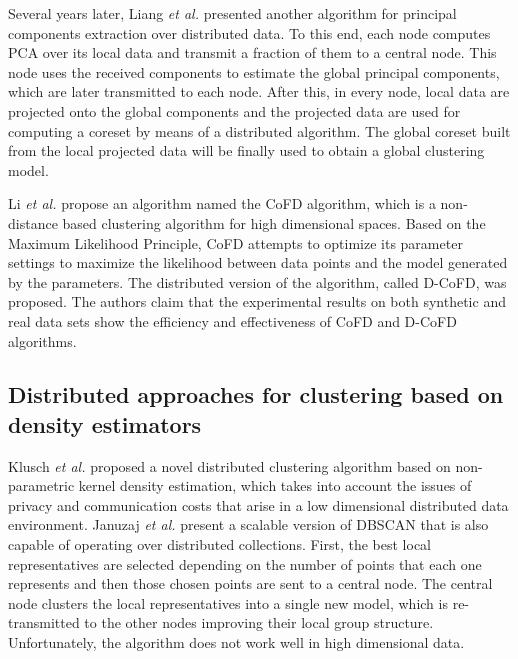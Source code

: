 \documentclass[preprint,12pt,authoryear,review]{elsarticle}
\begin{document}
Several years later, Liang \textit{et al.} \cite{LBK13} presented another algorithm for principal components extraction over distributed data. To this end, each node computes PCA over its local data and transmit a fraction of them to a central node. This node uses the received components to estimate the global principal components, which are later transmitted to each node. After this, in every node, local data are projected onto the global components and the projected data are used for computing a coreset by means of a distributed algorithm. The global coreset built from the local projected data will be finally used to obtain a global clustering model.  

Li \textit{et al.} \cite{LZO03} propose an algorithm named the CoFD algorithm, which is a non-distance based clustering algorithm for high dimensional spaces. Based on the Maximum Likelihood Principle, CoFD attempts to optimize its parameter settings to maximize the likelihood between data points and the model generated by the parameters. The distributed version of the algorithm, called D-CoFD, was proposed. The authors claim that the experimental results on both synthetic and real data sets show the efficiency and effectiveness of CoFD and D-CoFD algorithms.

\subsection{Distributed approaches for clustering based on density estimators}

Klusch \textit{et al.} \cite{KLM03} proposed a novel distributed clustering algorithm based on non-parametric kernel density estimation, which takes into account the issues of privacy and communication costs that arise in a low dimensional distributed data environment. %
Januzaj \textit{et al.} \cite{JKP04} present a scalable version of DBSCAN that is also capable of operating over distributed collections. First, the best local representatives are selected depending on the number of points that each one represents and then those chosen points are sent to a central node. The central node clusters the local representatives into a single new model, which is re-transmitted to the other nodes improving their local group structure. Unfortunately, the algorithm does not work well in high dimensional data. 
\end{document}

